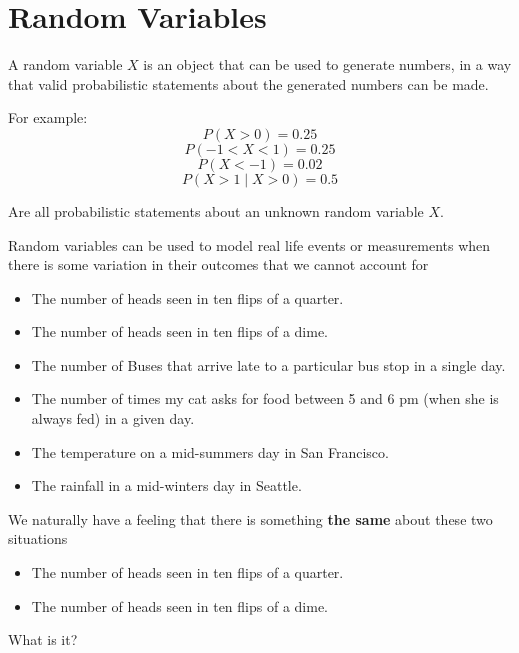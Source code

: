 \section{Random Variables}

\begin{frame}
A random variable $X$ is an object that can be used to generate numbers, in a way that valid probabilistic statements about the generated numbers can be made. 

\hfill

For example:
$$ P(X > 0) = 0.25 $$
$$ P(-1 < X < 1) = 0.25 $$
$$ P(X < -1) = 0.02 $$
$$ P(X > 1 \mid X > 0) = 0.5 $$

Are all probabilistic statements about an unknown random variable $X$.
\end{frame}
%

%
\begin{frame}
Random variables can be used to model real life events or measurements when
there is some variation in their outcomes that we cannot account for

\begin{itemize}
\item The number of heads seen in ten flips of a quarter.
\item The number of heads seen in ten flips of a dime.
\item The number of Buses that arrive late to a particular bus stop in a single
day.
\item The number of times my cat asks for food between 5 and 6 pm (when she is
always fed) in a given day.
\item The temperature on a mid-summers day in San Francisco.
\item The rainfall in a mid-winters day in Seattle.
\end{itemize}

\end{frame}
%

%
\begin{frame}
We naturally have a feeling that there is something \textbf{the same} about
these two situations

\begin{itemize}
\item The number of heads seen in ten flips of a quarter.
\item The number of heads seen in ten flips of a dime.
\end{itemize}

What is it?
\end{frame}
%

